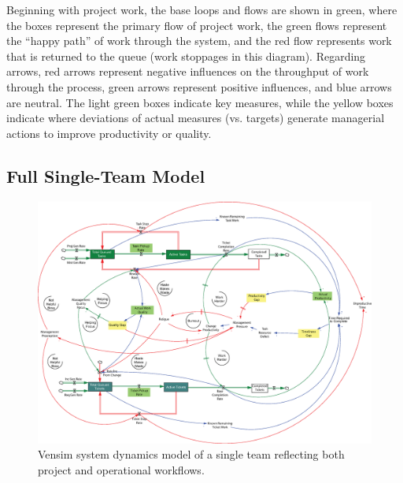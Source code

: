 \documentclass[conference]{IEEEtran}
\begin{document}
Beginning with project work, the base loops and flows are shown in green, where the boxes represent the primary flow of project work, the green flows represent the ``happy path'' of work through the system, and the red flow represents work that is returned to the queue (work stoppages in this diagram). Regarding arrows, red arrows represent negative influences on the throughput of work through the process, green arrows represent positive influences, and blue arrows are neutral. The light green boxes indicate key measures, while the yellow boxes indicate where deviations of actual measures (vs. targets) generate managerial actions to improve productivity or quality.

\subsection{Full Single-Team Model}
\label{sec:fullsingleteam}

\begin{figure}[t]
\centering
\includegraphics[width=0.9\linewidth]{Images/4switchcostprodv2.eps}
\caption{Vensim system dynamics model of a single team reflecting both project and operational workflows.}
\label{fig:4switchcostprodv2}
\end{figure}
\end{document}
